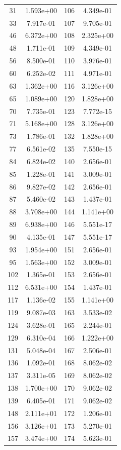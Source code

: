 \documentclass[12pt]{article}
\begin{document}
\begin{longtable}{@{}cccc@{}}
31 & 1.593e+00 & 106 & 4.349e-01 \\
33 & 7.917e-01 & 107 & 9.705e-01 \\
46 & 6.372e+00 & 108 & 2.325e+00 \\
48 & 1.711e-01 & 109 & 4.349e-01 \\
56 & 8.500e-01 & 110 & 3.976e-01 \\
60 & 6.252e-02 & 111 & 4.971e-01 \\
63 & 1.362e+00 & 116 & 3.126e+00 \\
65 & 1.089e+00 & 120 & 1.828e+00 \\
70 & 7.735e-01 & 123 & 7.772e-15 \\
71 & 5.168e+00 & 128 & 3.126e+00 \\
73 & 1.786e-01 & 132 & 1.828e+00 \\
77 & 6.561e-02 & 135 & 7.550e-15 \\
84 & 6.824e-02 & 140 & 2.656e-01 \\
85 & 1.228e-01 & 141 & 3.009e-01 \\
86 & 9.827e-02 & 142 & 2.656e-01 \\
87 & 5.460e-02 & 143 & 1.437e-01 \\
88 & 3.708e+00 & 144 & 1.141e+00 \\
89 & 6.938e+00 & 146 & 5.551e-17 \\
90 & 4.135e-01 & 147 & 5.551e-17 \\
93 & 1.954e+00 & 151 & 2.656e-01 \\
95 & 1.563e+00 & 152 & 3.009e-01 \\
102 & 1.365e-01 & 153 & 2.656e-01 \\
112 & 6.531e+00 & 154 & 1.437e-01 \\
117 & 1.136e-02 & 155 & 1.141e+00 \\
119 & 9.087e-03 & 163 & 3.533e-02 \\
124 & 3.628e-01 & 165 & 2.244e-01 \\
129 & 6.310e-04 & 166 & 1.222e+00 \\
131 & 5.048e-04 & 167 & 2.506e-01 \\
136 & 1.092e-01 & 168 & 8.062e-02 \\
137 & 3.311e-05 & 169 & 8.062e-02 \\
138 & 1.700e+00 & 170 & 9.062e-02 \\
139 & 6.405e-01 & 171 & 9.062e-02 \\
148 & 2.111e+01 & 172 & 1.206e-01 \\
156 & 3.126e+01 & 173 & 5.270e-01 \\
157 & 3.474e+00 & 174 & 5.623e-01 \\

\end{longtable}
\end{document}
